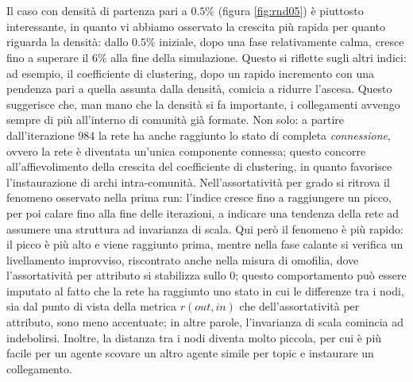 \documentclass[a4paper,12pt]{article}
\begin{document}
\\ \\Il caso con densità di partenza pari a $0.5\%$ (figura \ref{fig:rnd05}) è piuttosto interessante, in quanto vi abbiamo osservato la crescita più rapida per quanto riguarda la densità: dallo $0.5\%$ iniziale, dopo una fase relativamente calma, cresce fino a superare il $6\%$ alla fine della simulazione. Questo si riflette sugli altri indici: ad esempio, il coefficiente di clustering, dopo un rapido incremento con una pendenza pari a quella assunta dalla densità, comicia a ridurre l'ascesa. Questo suggerisce che, man mano che la densità si fa importante, i collegamenti avvengo sempre di più all'interno di comunità già formate. Non solo: a partire dall'iterazione 984 la rete ha anche raggiunto lo stato di completa \textit{connessione}, ovvero la rete è diventata un'unica componente connessa; questo concorre all'affievolimento della crescita del coefficiente di clustering, in quanto favorisce l'instaurazione di archi intra-comunità. Nell'assortatività per grado si ritrova il fenomeno osservato nella prima run: l'indice cresce fino a raggiungere un picco, per poi calare fino alla fine delle iterazioni, a indicare una tendenza della rete ad assumere una struttura ad invarianza di scala. Qui però il fenomeno è più rapido: il picco è più alto e viene raggiunto prima, mentre nella fase calante si verifica un livellamento improvviso, riscontrato anche nella misura di omofilia, dove l'assortatività per attributo si stabilizza sullo 0; questo comportamento può essere imputato al fatto che la rete ha raggiunto uno stato in cui le differenze tra i nodi, sia dal punto di vista della metrica $r(out,in)$ che dell'assortatività per attributo, sono meno accentuate; in altre parole, l'invarianza di scala comincia ad indebolirsi. Inoltre, la distanza tra i nodi diventa molto piccola, per cui è più facile per un agente scovare un altro agente simile per topic e instaurare un collegamento. 
\end{document}
